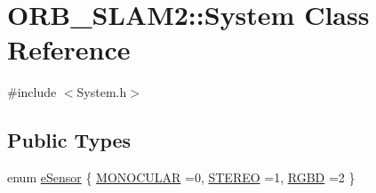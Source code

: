 \hypertarget{class_o_r_b___s_l_a_m2_1_1_system}{}\section{O\+R\+B\+\_\+\+S\+L\+A\+M2\+:\+:System Class Reference}
\label{class_o_r_b___s_l_a_m2_1_1_system}


{\ttfamily \#include $<$System.\+h$>$}

\subsection*{Public Types}
\begin{DoxyCompactItemize}
\item 
enum \mbox{\hyperlink{class_o_r_b___s_l_a_m2_1_1_system_a3f14b84bb9663e1129e649e592bd14cf}{e\+Sensor}} \{ \mbox{\hyperlink{class_o_r_b___s_l_a_m2_1_1_system_a3f14b84bb9663e1129e649e592bd14cfad1e5840d6aeaa77d25724ea0b27437cd}{M\+O\+N\+O\+C\+U\+L\+AR}} =0, 
\mbox{\hyperlink{class_o_r_b___s_l_a_m2_1_1_system_a3f14b84bb9663e1129e649e592bd14cfa6d4fa33f59566841b81a92625419c177}{S\+T\+E\+R\+EO}} =1, 
\mbox{\hyperlink{class_o_r_b___s_l_a_m2_1_1_system_a3f14b84bb9663e1129e649e592bd14cfa1c8a78c1a9b7ac931a73f230687b2c7c}{R\+G\+BD}} =2
 \}
\end{DoxyCompactItemize}
